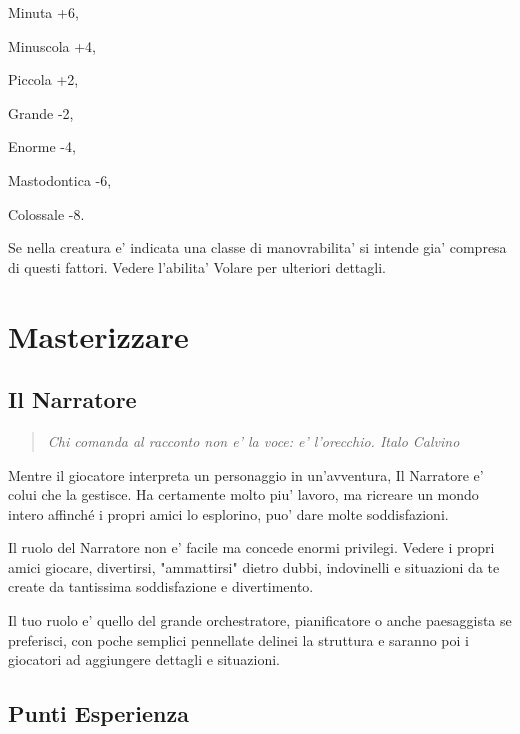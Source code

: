 \documentclass[a4paper,11pt,twoside,openany]{book}
\begin{document}
{Minuta +6,

Minuscola +4,

Piccola +2,

Grande -2,

Enorme -4,

Mastodontica -6,

Colossale -8.

Se nella creatura e' indicata una classe di manovrabilita' si intende gia' compresa di questi fattori. Vedere l'abilita' Volare per ulteriori dettagli.

\pagebreak

\section{Masterizzare}

\label{masterizzare}


\subsection{Il Narratore}

\begin{quote}\textit{
{Chi comanda al racconto non e' la voce: e' l'orecchio. Italo Calvino}
}\end{quote}


\label{il-narratore}

Mentre il giocatore interpreta un personaggio in un'avventura, Il Narratore e' colui che la gestisce. Ha certamente molto piu' lavoro, ma ricreare un mondo intero affinché i propri amici lo esplorino, puo' dare molte soddisfazioni.

Il ruolo del Narratore non e' facile ma concede enormi privilegi. Vedere i propri amici giocare, divertirsi, "ammattirsi" dietro dubbi, indovinelli e situazioni da te create da tantissima soddisfazione e divertimento.

Il tuo ruolo e' quello del grande orchestratore, pianificatore o anche paesaggista se preferisci, con poche semplici pennellate delinei la struttura e saranno poi i giocatori ad aggiungere dettagli e situazioni.



\subsection{Punti Esperienza}

\label{punti-esperienza}

}
\end{document}
